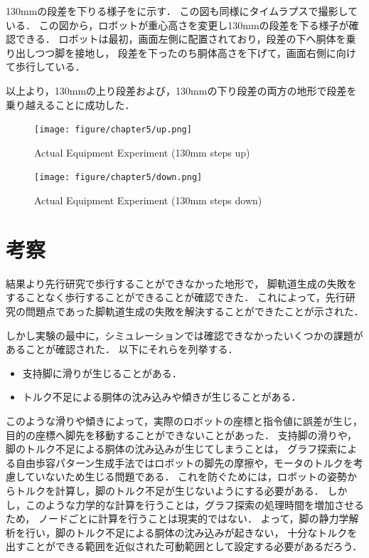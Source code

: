 130mmの段差を下りる様子をに示す．
この図も同様にタイムラプスで撮影している．
この図から，ロボットが重心高さを変更し130mmの段差を下る様子が確認できる．
ロボットは最初，画面左側に配置されており，段差の下へ胴体を乗り出しつつ脚を接地し，
段差を下ったのち胴体高さを下げて，画面右側に向けて歩行している．

以上より，130mmの上り段差および，130mmの下り段差の両方の地形で段差を乗り越えることに成功した．

\begin{figure}[h]
  \centering
  \texttt{[image: figure/chapter5/up.png]}
  \caption{Actual Equipment Experiment (130mm steps up)}
  \label{fig:ch5_experiment_1}  %
\end{figure}

\begin{figure}[h]
  \centering
  \texttt{[image: figure/chapter5/down.png]}
  \caption{Actual Equipment Experiment (130mm steps down)}
  \label{fig:ch5_experiment_2}  %
\end{figure}

\section{考察}
結果より先行研究で歩行することができなかった地形で，
脚軌道生成の失敗をすることなく歩行することができることが確認できた．
これによって，先行研究の問題点であった脚軌道生成の失敗を解決することができたことが示された．

しかし実験の最中に，シミュレーションでは確認できなかったいくつかの課題があることが確認された．
以下にそれらを列挙する．

\begin{itemize}
  \item 支持脚に滑りが生じることがある．
  \item トルク不足による胴体の沈み込みや傾きが生じることがある．
\end{itemize}

このような滑りや傾きによって，実際のロボットの座標と指令値に誤差が生じ，目的の座標へ脚先を移動することができないことがあった．
支持脚の滑りや，脚のトルク不足による胴体の沈み込みが生じてしまうことは，
グラフ探索による自由歩容パターン生成手法ではロボットの脚先の摩擦や，モータのトルクを考慮していないため生じる問題である．
これを防ぐためには，ロボットの姿勢からトルクを計算し，脚のトルク不足が生じないようにする必要がある．
しかし，このような力学的な計算を行うことは，グラフ探索の処理時間を増加させるため，
ノードごとに計算を行うことは現実的ではない．
よって，脚の静力学解析を行い，脚のトルク不足による胴体の沈み込みが起きない，
十分なトルクを出すことができる範囲を近似された可動範囲として設定する必要があるだろう．

